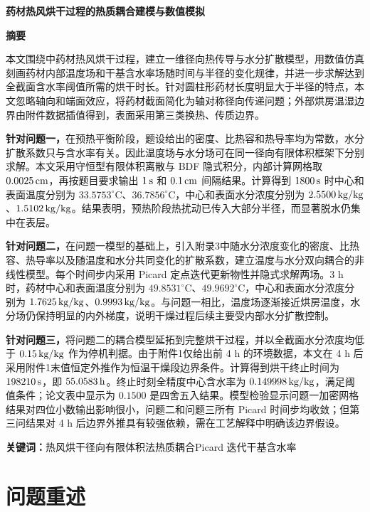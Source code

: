 \documentclass[UTF8,a4paper,12pt]{ctexart}
\numberwithin{equation}{section}
\begin{document}
\begin{center}
  {\fontsize{14pt}{18pt}\selectfont\bfseries 药材热风烘干过程的热质耦合建模与数值模拟}\par\vspace{10pt}
  {\fontsize{14pt}{18pt}\selectfont\bfseries 摘要}
\end{center}

本文围绕中药材热风烘干过程，建立一维径向热传导与水分扩散模型，用数值仿真刻画药材内部温度场和干基含水率场随时间与半径的变化规律，并进一步求解达到全截面含水率阈值所需的烘干时长。针对圆柱形药材长度明显大于半径的特点，本文忽略轴向和端面效应，将药材截面简化为轴对称径向传递问题；外部烘房温湿边界由附件数据插值得到，表面采用第三类换热、传质边界。

\noindent \textbf{针对问题一，}在预热平衡阶段，题设给出的密度、比热容和热导率均为常数，水分扩散系数只与含水率有关。因此温度场与水分场可在同一径向有限体积框架下分别求解。本文采用守恒型有限体积离散与 BDF 隐式积分，内部计算网格取 $0.0025\rm\,cm$，再按题目要求输出 $1\rm\,s$ 和 $0.1\rm\,cm$ 间隔结果。计算得到 $1800\rm\,s$ 时中心和表面温度分别为 $33.5753^\circ\mathrm C$、$36.7856^\circ\mathrm C$，中心和表面水分浓度分别为 $2.5500\rm\,kg/kg$、$1.5102\rm\,kg/kg$。结果表明，预热阶段热扰动已传入大部分半径，而显著脱水仍集中在表层。

\noindent \textbf{针对问题二，}在问题一模型的基础上，引入附录3中随水分浓度变化的密度、比热容、热导率以及随温度和水分共同变化的扩散系数，建立温度与水分双向耦合的非线性模型。每个时间步内采用 Picard 定点迭代更新物性并隐式求解两场。3 h 时，药材中心和表面温度分别为 $49.8531^\circ\mathrm C$、$49.9692^\circ\mathrm C$，中心和表面水分浓度分别为 $1.7625\rm\,kg/kg$、$0.9993\rm\,kg/kg$。与问题一相比，温度场逐渐接近烘房温度，水分场仍保持明显的内外梯度，说明干燥过程后续主要受内部水分扩散控制。

\noindent \textbf{针对问题三，}将问题二的耦合模型延拓到完整烘干过程，并以全截面水分浓度均低于 $0.15\rm\,kg/kg$ 作为停机判据。由于附件1仅给出前 4 h 的环境数据，本文在 4 h 后采用附件1末值恒定外推作为恒温干燥段边界条件。计算得到烘干终止时间为 $198210\rm\,s$，即 $55.0583\rm\,h$。终止时刻全精度中心含水率为 $0.149998\rm\,kg/kg$，满足阈值条件；论文表中显示为 $0.1500$ 是四舍五入结果。模型检验显示问题一加密网格结果对四位小数输出影响很小，问题二和问题三所有 Picard 时间步均收敛；但第三问结果对 4 h 后边界外推具有较强依赖，需在工艺解释中明确该边界假设。

\noindent \textbf{关键词：}热风烘干\quad 径向有限体积法\quad 热质耦合\quad Picard 迭代\quad 干基含水率

\section{问题重述}
\end{document}
